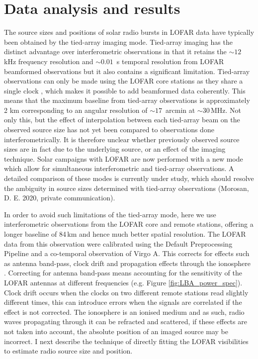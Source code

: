 \section{Data analysis and results} \label{sec:data}
The source sizes and positions of solar radio bursts in LOFAR data have typically been obtained by the tied-array imaging mode. Tied-array imaging has the distinct advantage over interferometric observations in that it retains the ${\sim} 12$ kHz frequency resolution and ${\sim} 0.01$~s temporal resolution from LOFAR beamformed observations but it also contains a significant limitation. Tied-array observations can only be made using the LOFAR core stations as they share a single clock \citep{DeGasperin2019}, which makes it possible to add beamformed data coherently. This means that the maximum baseline from tied-array observations is approximately 2 km corresponding to an angular resolution of ${\sim} 17$~arcmin at ${\sim} 30$\,MHz. Not only this, but the effect of interpolation between each tied-array beam on the observed source size has not yet been compared to observations done interferometrically. It is therefore unclear whether previously observed source sizes are in fact due to the underlying source, or an effect of the imaging technique. Solar campaigns with LOFAR are now performed with a new mode which allow for simultaneous interferometric and tied-array observations. A detailed comparison of these modes is currently under study, which should resolve the ambiguity in source sizes determined with tied-array observations (Morosan, D. E. 2020, private communication). 

In order to avoid such limitations of the tied-array mode, here we use interferometric observations from the LOFAR core and remote stations, offering a longer baseline of 84\,km and hence much better spatial resolution.
The LOFAR data from this observation were calibrated using the Default Preprocessing Pipeline \cite[DPPP;][]{VanDiepen2018} and a co-temporal observation of Virgo A. This corrects for effects such as antenna band-pass, clock drift and propagation effects through the ionosphere \citep{DeGasperin2019}. Correcting for antenna band-pass means accounting for the sensitivity of the LOFAR antennas at different frequencies (e.g. Figure \ref{fig:LBA_power_spec}). Clock drift occurs when the clocks on two different remote stations read slightly different times, this can introduce errors when the signals are correlated if the effect is not corrected. The ionosphere is an ionised medium and as such, radio waves propagating through it can be refracted and scattered, if these effects are not taken into account, the absolute position of an imaged source may be incorrect.
I next describe the technique of directly fitting the LOFAR visibilities to estimate radio source size and position.

